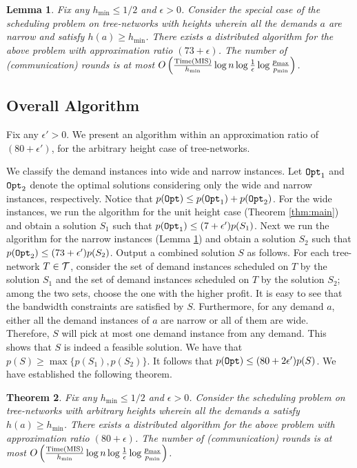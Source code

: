 \documentclass[11pt]{article}
\newtheorem{theorem}{\bf Theorem}[section]
\newtheorem{lemma}[theorem]{\bf Lemma}
\newcommand{\calT} {{\cal T}}
\newcommand{\Opt} {{\tt Opt}}
\newcommand{\TMIS} {{\rm Time(MIS)}}
\begin{document}
\begin{lemma}
\label{lem:KKK}
Fix any $h_{\min}\leq 1/2$ and $\epsilon>0$. Consider the special case of the scheduling problem on tree-networks
with heights wherein all the demands $a$ are narrow and satisfy $h(a)\geq h_{\min}$.
There exists a distributed algorithm for the above problem with approximation ratio $(73+\epsilon)$.
The number of (communication) rounds is at most 
$O\left( \frac{\TMIS}{h_{\min}} \log n \log{ \frac{1}{\epsilon} } \log{ \frac{p_{\max}}{p_{\min}} }\right)$.
\end{lemma}

\subsection*{Overall Algorithm}
Fix any $\epsilon'>0$. We present an algorithm within an approximation ratio of $(80+\epsilon')$,
for the arbitrary height case of tree-networks.

We classify the demand instances into wide and narrow instances.
Let $\Opt_1$ and $\Opt_2$ denote the optimal solutions considering only the wide and narrow instances,
respectively. Notice that $p(\Opt) \leq p(\Opt_1) + p(\Opt_2)$.
For the wide instances, we run the algorithm for the unit height case (Theorem \ref{thm:main})
and obtain a solution $S_1$ such that $p(\Opt_1)\leq (7+\epsilon')p(S_1)$.
Next we run the algorithm for the narrow instances (Lemma \ref{lem:KKK})
and obtain a solution $S_2$ such that $p(\Opt_2)\leq (73+\epsilon')p(S_2)$.
Output a combined solution $S$ as follows.
For each tree-network $T\in \calT$, consider the set of demand instances scheduled on $T$ by the solution $S_1$
and the set of demand instances scheduled on $T$ by the solution $S_2$; among the two sets, choose the one
with the higher profit. It is easy to see that the bandwidth constraints are satisfied by $S$.
Furthermore, for any demand $a$, either all the demand instances of $a$ are narrow
or all of them are wide. Therefore, $S$ will pick at most one demand instance from any demand.
This shows that $S$ is indeed a feasible solution.
We have that $p(S)\geq \max\{p(S_1),p(S_2)\}$. It follows that $p(\Opt)\leq (80+2\epsilon')p(S)$.
We have established the following theorem.

\begin{theorem}
\label{thm:LLL}
Fix any $h_{\min}\leq 1/2$ and $\epsilon>0$. Consider the scheduling problem on tree-networks
with arbitrary heights wherein all the demands $a$ satisfy $h(a) \geq h_{\min}$.
There exists a distributed algorithm for the above problem with approximation ratio $(80+\epsilon)$.
The number of (communication) rounds is at most 
$O\left( \frac{\TMIS}{h_{\min}} \log n \log{ \frac{1}{\epsilon} } \log{ \frac{p_{\max}}{p_{\min}} }\right)$.
\end{theorem}
\end{document}
